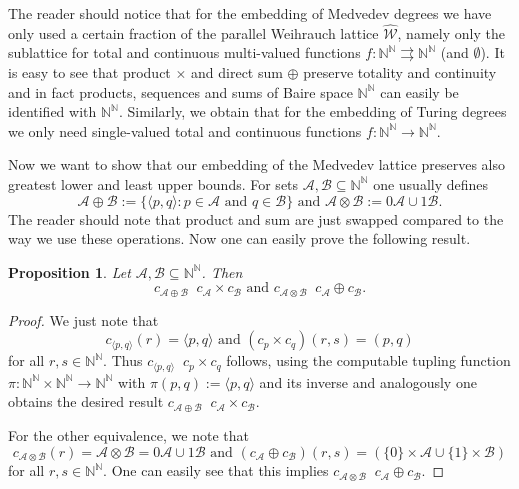 \documentclass[jsl,10pt]{noasl}
\def\AA{{\mathcal A}}
\def\BB{{\mathcal B}}
\def\WW{{\mathcal W}}
\def\IN{{\mathbb{N}}}
\def\In{\subseteq}
\def\mto{\rightrightarrows}
\def\cf{{\rm cf}}
\def\leqT{\mathop{\leq_{\mathrm{T}}}}
\def\equivSW{\mathop{\equiv_{\mathrm{sW}}}}
\def\leqPW{\mathop{\leq_{\widehat{\mathrm{W}}}}}
\def\emptyW{\boldsymbol{\emptyset}}
\newtheorem{proposition}{Proposition}[section]
\newtheorem{corollary}[proposition]{Corollary}
\begin{document}
%
The reader should notice that for the embedding of Medvedev degrees 
we have only used a certain fraction of the parallel Weihrauch lattice $\widehat{\WW}$,
namely only the sublattice for total and continuous multi-valued functions $f:\IN^\IN\mto\IN^\IN$ (and
$\emptyW$). It is easy to see that product $\times$ and direct sum $\oplus$ preserve
totality and continuity and in fact products, sequences and sums of Baire space $\IN^\IN$ can easily 
be identified with $\IN^\IN$. Similarly, we obtain that for the embedding of
Turing degrees we only need single-valued total and continuous functions $f:\IN^\IN\to\IN^\IN$.

Now we want to show that our embedding of the Medvedev lattice preserves
also greatest lower and least upper bounds. For sets $\AA,\BB\In\IN^\IN$ 
one usually defines 
\[\AA\oplus\BB:=\{\langle p,q\rangle:p\in\AA\mbox{ and }q\in\BB\}
\mbox{ and } 
\AA\otimes\BB:=0\AA\cup1\BB.
\]
The reader should note that product and sum are just swapped compared
to the way we use these operations. Now one can easily prove the following result.

\begin{proposition}
Let $\AA,\BB\In\IN^\IN$. Then
\[c_{\AA\oplus\BB}\equivSW c_\AA\times c_\BB\mbox{ and }c_{\AA\otimes\BB}\equivSW c_\AA\oplus c_\BB.\]
\end{proposition}
\begin{proof}
We just note that 
\[c_{\langle p,q\rangle}(r)=\langle p,q\rangle\mbox{ and }(c_p\times c_q)(r,s)=(p,q)\]
for all $r,s\in\IN^\IN$. Thus $c_{\langle p,q\rangle}\equivSW c_p\times c_q$ follows,
using the computable tupling function $\pi:\IN^\IN\times\IN^\IN\to\IN^\IN$ with 
$\pi(p,q):=\langle p,q\rangle$ and its inverse
and analogously one obtains the desired result $c_{\AA\oplus\BB}\equivSW c_\AA\times c_\BB$.

For the other equivalence, we note that
\[c_{\AA\otimes\BB}(r)=\AA\otimes\BB=0\AA\cup 1\BB\mbox{ and }(c_\AA\oplus c_\BB)(r,s)=(\{0\}\times\AA\cup\{1\}\times\BB)\]
for all $r,s\in\IN^\IN$.
One can easily see that this implies $c_{\AA\otimes\BB}\equivSW c_\AA\oplus c_\BB$.
\end{proof}
\end{document}
